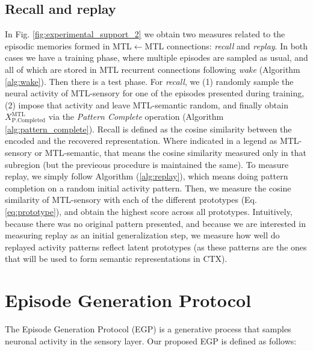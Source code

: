 \documentclass{article}
\begin{document}
\subsection*{Recall and replay}
In Fig. \ref{fig:experimental_support_2} we obtain two measures related to the episodic memories formed in MTL$\leftarrow$MTL connections: \textit{recall} and \textit{replay}. In both cases we have a training phase, where multiple episodes are sampled as usual, and all of which are stored in MTL recurrent connections following \textit{wake} (Algorithm \ref{alg:wake}). Then there is a test phase. For \textit{recall}, we (1) randomly sample the neural activity of MTL-sensory for one of the episodes presented during training, (2) impose that activity and leave MTL-semantic random, and finally obtain $X^\textrm{MTL}_\textrm{P.Completed}$ via the \textit{Pattern Complete} operation (Algorithm \ref{alg:pattern_complete}). Recall is defined as the cosine similarity between the encoded and the recovered representation. Where indicated in a legend as MTL-sensory or MTL-semantic, that means the cosine similarity measured only in that subregion (but the previeous procedure is maintained the same). To measure  replay, we simply follow Algorithm (\ref{alg:replay}), which means doing pattern completion on a random initial activity pattern. Then, we measure the cosine similarity of MTL-sensory with each of the different prototypes (Eq. \eqref{eq:prototype}), and obtain the highest score across all prototypes. Intuitively, because there was no original pattern presented, and because we are interested in measuring replay as an initial generalization step, we measure how well do replayed activity patterns reflect latent prototypes (as these patterns are the ones that will be used to form semantic representations in CTX).
\section*{Episode Generation Protocol}
The Episode Generation Protocol (EGP) is a generative process that samples neuronal activity in the sensory layer. Our proposed EGP is defined as follows:
\end{document}
